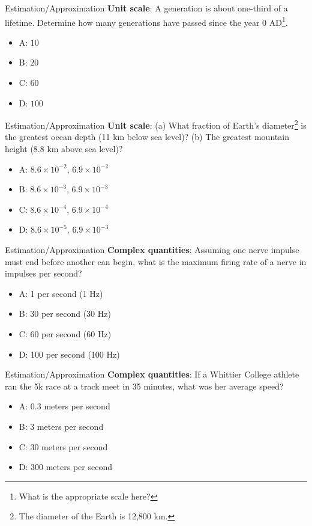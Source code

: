 \documentclass{beamer}
\begin{document}
\begin{frame}{Estimation/Approximation}
\textbf{Unit scale}: A generation is about one-third of a lifetime. Determine how many generations have passed since the year 0 AD\footnote{What is the appropriate scale here?}.
\begin{itemize}
\item A: $10$
\item B: $20$
\item C: $60$
\item D: $100$
\end{itemize}
\end{frame}

\begin{frame}{Estimation/Approximation}
\textbf{Unit scale}: (a) What fraction of Earth’s diameter\footnote{The diameter of the Earth is 12,800 km.} is the greatest ocean depth (11 km below sea level)? (b) The greatest mountain height (8.8 km above sea level)?
\begin{itemize}
\item A: $8.6 \times 10^{-2}$, $6.9 \times 10^{-2}$
\item B: $8.6 \times 10^{-3}$, $6.9 \times 10^{-3}$
\item C: $8.6 \times 10^{-4}$, $6.9 \times 10^{-4}$
\item D: $8.6 \times 10^{-5}$, $6.9 \times 10^{-3}$
\end{itemize}
\end{frame}

\begin{frame}{Estimation/Approximation}
\textbf{Complex quantities}: Assuming one nerve impulse must end before another can begin, what is the maximum firing rate of a nerve in impulses per second? 
\begin{itemize}
\item A: 1 per second (1 Hz)
\item B: 30 per second (30 Hz)
\item C: 60 per second (60 Hz)
\item D: 100 per second (100 Hz)
\end{itemize}
\end{frame}

\begin{frame}{Estimation/Approximation}
\textbf{Complex quantities}: If a Whittier College athlete ran the 5k race at a track meet in 35 minutes, what was her average speed?
\begin{itemize}
\item A: 0.3 meters per second
\item B: 3 meters per second
\item C: 30 meters per second
\item D: 300 meters per second
\end{itemize}
\end{frame}
\end{document}
